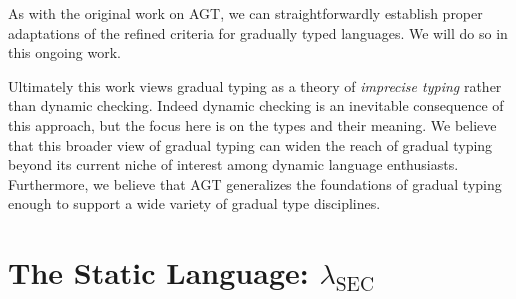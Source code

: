 \documentclass[authoryear,sort&compress,9pt,twocolumn,nocopyrightspace]{sigplanconf}
\newcommand{\lsec}{$\lambda_\text{SEC}$\xspace}
\newcommand{\?}{\textsf{\upshape ?}} \newcommand{\consistent}[1]{\widetilde{#1}}
\begin{document}
As with the original work on AGT, we can straightforwardly establish proper
adaptations of the refined criteria for gradually typed languages.  We will do
so in this ongoing work.

Ultimately this work views gradual typing as a theory of \emph{imprecise
  typing} rather than dynamic checking.  Indeed dynamic checking is an
inevitable consequence of this approach, but the focus here is on the types and
their meaning.  We believe that this broader view of gradual typing can widen
the reach of gradual typing beyond its current niche of interest among
dynamic language enthusiasts.  Furthermore, we believe that AGT generalizes the
foundations of gradual typing enough to support a wide variety of
gradual type disciplines.



\section{The Static Language: \lsec}
\end{document}
